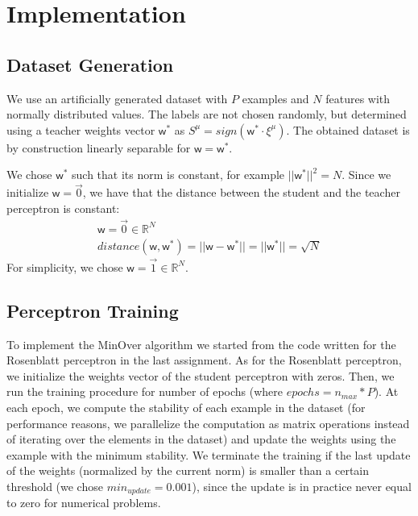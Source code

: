 \section{Implementation}
\label{sec:implementation}

\subsection{Dataset Generation}
We use an artificially generated dataset with $P$ examples and $N$ features with normally distributed values.
The labels are not chosen randomly, but determined using a teacher weights vector $\bm{\mathsf{w}}^*$ as $S^\mu = sign(\mathsf{w}^{*} \cdotp \xi^\mu)$.
The obtained dataset is by construction linearly separable for $\bm{\mathsf{w}} = \bm{\mathsf{w}}^*$.

We chose $\bm{\mathsf{w}}^*$ such that its norm is constant, for example $||\bm{\mathsf{w}}^*||^2 = N$.
Since we initialize $\bm{\mathsf{w}} = \overrightarrow{0}$, we have that the distance between the student and the teacher perceptron is constant:
\begin{gather*}
    \bm{\mathsf{w}} = \overrightarrow{0} \in \mathbb{R}^N \\
    distance(\bm{\mathsf{w}}, \bm{\mathsf{w}}^*) = || \bm{\mathsf{w}} - \bm{\mathsf{w}}^* || = || \bm{\mathsf{w}}^*|| = \sqrt{N}
\end{gather*}
For simplicity, we chose $\bm{\mathsf{w}} = \overrightarrow{1} \in \mathbb{R}^N$.

\subsection{Perceptron Training}
To implement the MinOver algorithm we started from the code written for the Rosenblatt perceptron in the last assignment.
As for the Rosenblatt perceptron, we initialize the weights vector of the student perceptron with zeros.
Then, we run the training procedure for number of epochs (where $epochs = n_{max} * P$).
At each epoch, we compute the stability of each example in the dataset (for performance reasons, we parallelize the computation as matrix operations instead of iterating over the elements in the dataset) and update the weights using the example with the minimum stability.
We terminate the training if the last update of the weights (normalized by the current norm) is smaller than a certain threshold (we chose $min_{update} = 0.001$), since the update is in practice never equal to zero for numerical problems.

